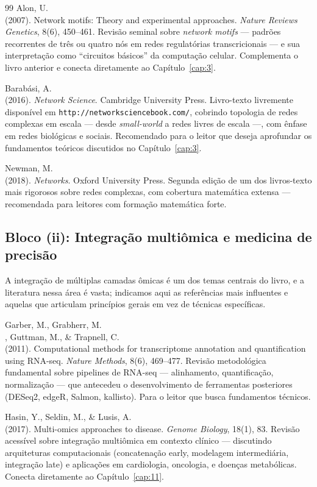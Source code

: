\begin{thebibliography}{99}
 Alon, U.\\ (2007). Network motifs: Theory and experimental approaches. \emph{Nature Reviews Genetics}, 8(6), 450--461. Revisão seminal sobre \emph{network motifs} --- padrões recorrentes de três ou quatro nós em redes regulatórias transcricionais --- e sua interpretação como ``circuitos básicos'' da computação celular. Complementa o livro anterior e conecta diretamente ao Capítulo~\ref{cap:3}.

 Barabási, A.\\ (2016). \emph{Network Science}. Cambridge University Press. Livro-texto livremente disponível em \texttt{http://networksciencebook.com/}, cobrindo topologia de redes complexas em escala --- desde \emph{small-world} a redes livres de escala ---, com ênfase em redes biológicas e sociais. Recomendado para o leitor que deseja aprofundar os fundamentos teóricos discutidos no Capítulo~\ref{cap:3}.

 Newman, M.\\ (2018). \emph{Networks}. Oxford University Press. Segunda edição de um dos livros-texto mais rigorosos sobre redes complexas, com cobertura matemática extensa --- recomendada para leitores com formação matemática forte.



\subsection*{Bloco (ii): Integração multiômica e medicina de precisão}

A integração de múltiplas camadas ômicas é um dos temas centrais do livro, e a literatura nessa área é vasta; indicamos aqui as referências mais influentes e aquelas que articulam princípios gerais em vez de técnicas específicas.

 Garber, M., Grabherr, M.\\, Guttman, M., \& Trapnell, C.\\ (2011). Computational methods for transcriptome annotation and quantification using RNA-seq. \emph{Nature Methods}, 8(6), 469--477. Revisão metodológica fundamental sobre pipelines de RNA-seq --- alinhamento, quantificação, normalização --- que antecedeu o desenvolvimento de ferramentas posteriores (DESeq2, edgeR, Salmon, kallisto). Para o leitor que busca fundamentos técnicos.

 Hasin, Y., Seldin, M., \& Lusis, A.\\ (2017). Multi-omics approaches to disease. \emph{Genome Biology}, 18(1), 83. Revisão acessível sobre integração multiômica em contexto clínico --- discutindo arquiteturas computacionais (concatenação early, modelagem intermediária, integração late) e aplicações em cardiologia, oncologia, e doenças metabólicas. Conecta diretamente ao Capítulo~\ref{cap:11}.


\end{thebibliography}
